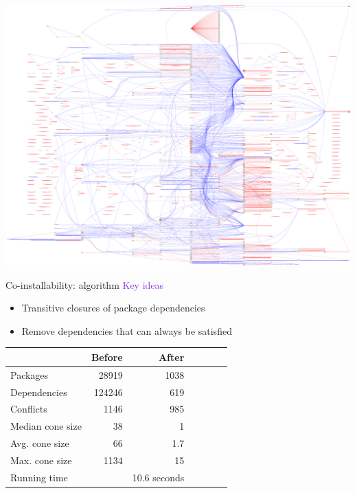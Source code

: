 \documentclass[xcolor={dvipsnames}]{beamer}
\newcommand{\EEE}[1]{\textcolor{BlueViolet}{#1}}
\begin{document}
\begin{frame}
\begin{center}
\includegraphics[width=\linewidth]{figures/flattened}
\end{center}
\end{frame}

\begin{frame}{Co-installability: algorithm}
\EEE{Key ideas}
\begin{itemize}
\item Transitive closures of package dependencies
\item Remove dependencies that can always be satisfied
\end{itemize}

\begin{center}
\begin{tabular}{@{}lrrrrrr@{}}
\toprule
& Before & After \\
\midrule
Packages & 28919 & 1038 \\
Dependencies & 124246 & 619 \\
Conflicts & 1146 & 985 \\
Median cone size & 38 & 1 \\
Avg. cone size & 66 & 1.7 \\
Max. cone size & 1134 & 15 \\
\midrule
Running time
& & 10.6 seconds
\\
\bottomrule
\end{tabular}
\end{center}

\end{frame}
\end{document}
